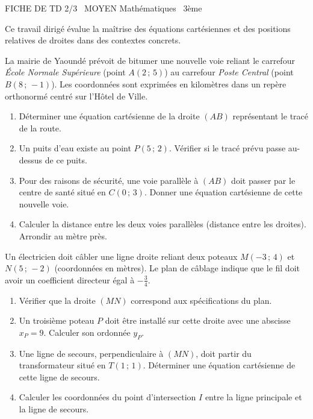 \documentclass[11pt]{article}
\begin{document}
\begin{tcolorbox}[enhanced,colback=popink,colframe=popink,arc=10pt,boxrule=0pt,left=12pt,right=12pt,top=9pt,bottom=9pt]
{\color{white}\popxbold\small FICHE DE TD 2/3 \textbullet\ MOYEN \hfill Mathématiques \textbullet\ 3ème\par}
\end{tcolorbox}
\vspace{4pt}
Ce travail dirigé évalue la maîtrise des équations cartésiennes et des positions relatives de droites dans des contextes concrets.

\begin{exercice}
La mairie de Yaoundé prévoit de bitumer une nouvelle voie reliant le carrefour \textit{École Normale Supérieure} (point $A(2\,;\,5)$) au carrefour \textit{Poste Central} (point $B(8\,;\,-1)$). Les coordonnées sont exprimées en kilomètres dans un repère orthonormé centré sur l'Hôtel de Ville.
\begin{enumerate}
    \item Déterminer une équation cartésienne de la droite $(AB)$ représentant le tracé de la route.
    \item Un puits d'eau existe au point $P(5\,;\,2)$. Vérifier si le tracé prévu passe au-dessus de ce puits.
    \item Pour des raisons de sécurité, une voie parallèle à $(AB)$ doit passer par le centre de santé situé en $C(0\,;\,3)$. Donner une équation cartésienne de cette nouvelle voie.
    \item Calculer la distance entre les deux voies parallèles (distance entre les droites). Arrondir au mètre près.
\end{enumerate}
\end{exercice}

\begin{exercice}
Un électricien doit câbler une ligne droite reliant deux poteaux $M(-3\,;\,4)$ et $N(5\,;\,-2)$ (coordonnées en mètres). Le plan de câblage indique que le fil doit avoir un coefficient directeur égal à $-\frac{3}{4}$.
\begin{enumerate}
    \item Vérifier que la droite $(MN)$ correspond aux spécifications du plan.
    \item Un troisième poteau $P$ doit être installé sur cette droite avec une abscisse $x_P = 9$. Calculer son ordonnée $y_P$.
    \item Une ligne de secours, perpendiculaire à $(MN)$, doit partir du transformateur situé en $T(1\,;\,1)$. Déterminer une équation cartésienne de cette ligne de secours.
    \item Calculer les coordonnées du point d'intersection $I$ entre la ligne principale et la ligne de secours.
\end{enumerate}
\end{exercice}
\end{document}

